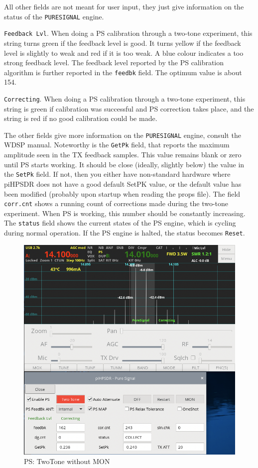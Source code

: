 \documentclass[12pt]{book}
\def\rett#1{\texttt{\color{red}#1}}
\def\bltt#1{\texttt{\color{blue}#1}}
\def\pH{pi\-HPSDR\xspace}
\begin{document}
All other fields are not meant for user input, they just give information on the status
of the \texttt{PURESIGNAL} engine.

\rett{Feedback Lvl}. When doing a PS calibration through a two-tone experiment, this string
turns green if the feedback level is good. It turns yellow if the feedback level is slightly
to weak and red if it is too weak. A blue colour indicates a too strong feedback level.
The feedback level reported by the PS calibration algorithm is further reported in the
\rett{feedbk} field. The optimum value is about 154.

\rett{Correcting}. When doing a PS calibration through a two-tone experiment, this string
is green if calibration was successful and PS correction takes place, and the string is
red if no good calibration could be made.

The other fields give more information on the \texttt{PURESIGNAL} engine, consult the
WDSP manual. Noteworthy is the \rett{GetPk} field, that reports the maximum amplitude
seen in the TX feedback samples. This value remains blank or zero until PS starts working.
It should be close (ideally, slightly below) the value in the \texttt{SetPk} field.
If not, then you either have non-standard hardware where \pH does not have a good
default SetPK value, or the default value has been modified (probably upon startup
when reading the props file). The field \rett{corr.cnt} shows a running count of corrections
made during the two-tone experiment. When PS is working, this number should be constantly
increasing. The \rett{status} field shows the current states of
the PS engine, which is cycling during normal operation. If the PS engine is halted,
the status becomes \bltt{Reset}.

\begin{figure}[t!]
\center
\includegraphics[scale=0.45]{PSnomon.png}
\caption{PS: TwoTone without MON}
\label{fig:PSnomon}
\end{figure}
\end{document}
